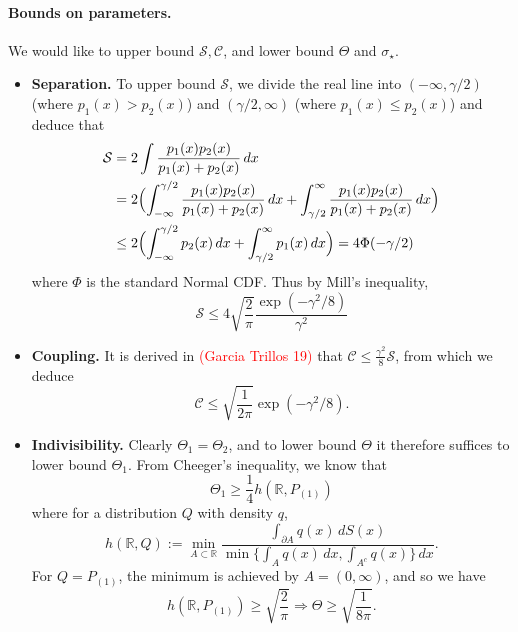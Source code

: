 \documentclass{article}
\newcommand{\Reals}{\mathbb{R}}
\newcommand{\1}{\mathbf{1}}
\newcommand{\mc}[1]{\mathcal{#1}}
\theoremstyle{alden}
\theoremstyle{aldenthm}
\theoremstyle{definition}
\theoremstyle{remark}
\begin{document}
\paragraph{Bounds on parameters.}
We would like to upper bound $\mc{S}, \mc{C}$, and lower bound $\Theta$ and $\sigma_{\star}$. 
\begin{itemize}
	\item \textbf{Separation.} To upper bound $\mc{S}$, we divide the real line into $(-\infty,\gamma/2)$ (where $p_1(x) > p_2(x)$) and $(\gamma/2,\infty)$ (where $p_1(x) \leq p_2(x)$) and deduce that
	\begin{align*}
	\mc{S} & = 2 \int \frac{p_1(x)p_2(x)}{p_1(x) + p_2(x)} \,dx \\
	& = 2 \Bigl( \int_{-\infty}^{\gamma/2} \frac{p_1(x)p_2(x)}{p_1(x) + p_2(x)} \,dx + \int_{\gamma/2}^{\infty} \frac{p_1(x)p_2(x)}{p_1(x) + p_2(x)} \,dx  \Bigr) \\
	& \leq 2 \Bigl( \int_{-\infty}^{\gamma/2} p_2(x) \,dx + \int_{\gamma/2}^{\infty} p_1(x) \,dx  \Bigr) = 4\Phi(-\gamma/2)
	\end{align*}
	where $\Phi$ is the standard Normal CDF. Thus by Mill's inequality,
	\begin{equation*}
	\mc{S} \leq 4\sqrt{\frac{2}{\pi}} \frac{\exp(-\gamma^2/8)}{\gamma^2}
	\end{equation*}
	\item \textbf{Coupling.} It is derived in \textcolor{red}{(Garcia Trillos 19)} that $\mc{C} \leq \frac{\gamma^2}{8}\mc{S}$, from which we deduce
	\begin{equation*}
	\mc{C} \leq \sqrt{\frac{1}{2\pi}}\exp(-\gamma^2/8).
	\end{equation*}
	\item \textbf{Indivisibility.} Clearly $\Theta_1 = \Theta_2$, and to lower bound $\Theta$ it therefore suffices to lower bound $\Theta_1$. From Cheeger's inequality, we know that
	\begin{equation*}
	\Theta_1 \geq \frac{1}{4}h(\Reals,P_{(1)})
	\end{equation*}
	where for a distribution $Q$ with density $q$, 
	\begin{equation*}
	h(\Reals,Q) := \min_{A \subset \Reals} \frac{\int_{\partial A} q(x) \,dS(x)}{\min \{\int_A q(x)\,dx, \int_{A^c} q(x)\} \,dx}.
	\end{equation*}
	For $Q = P_{(1)}$, the minimum is achieved by $A = (0,\infty)$, and so we have
	\begin{equation*}
	h(\Reals,P_{(1)}) \geq \sqrt{\frac{2}{\pi}}  \Longrightarrow \Theta \geq \sqrt{\frac{1}{8\pi}}.

\end{equation*}
\end{itemize}
\end{document}
